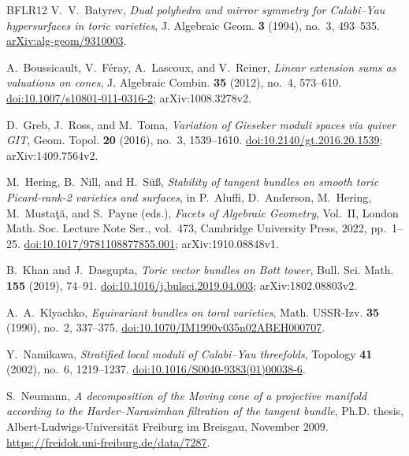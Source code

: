 \documentclass[11pt]{amsart}
\theoremstyle{definition}
\theoremstyle{remark}
\begin{document}
\begin{thebibliography}{BFLR12}
 V.~V.~Batyrev, \emph{Dual polyhedra and mirror symmetry for Calabi--Yau hypersurfaces in toric varieties}, J. Algebraic Geom. \textbf{3} (1994), no.~3, 493--535. \href{https://arxiv.org/abs/alg-geom/9310003}{arXiv:alg-geom/9310003}.

 A.~Boussicault, V.~F\'eray, A.~Lascoux, and V.~Reiner, \emph{Linear extension sums as valuations on cones}, J. Algebraic Combin. \textbf{35} (2012), no.~4, 573--610. \href{https://doi.org/10.1007/s10801-011-0316-2}{doi:10.1007/s10801-011-0316-2}; arXiv:1008.3278v2.

 D.~Greb, J.~Ross, and M.~Toma, \emph{Variation of Gieseker moduli spaces via quiver GIT}, Geom. Topol. \textbf{20} (2016), no.~3, 1539--1610. \href{https://doi.org/10.2140/gt.2016.20.1539}{doi:10.2140/gt.2016.20.1539}; arXiv:1409.7564v2.

 M.~Hering, B.~Nill, and H.~S\"u\ss, \emph{Stability of tangent bundles on smooth toric Picard-rank-2 varieties and surfaces}, in P.~Aluffi, D.~Anderson, M.~Hering, M.~Musta\c{t}\u{a}, and S.~Payne (eds.), \emph{Facets of Algebraic Geometry}, Vol.~II, London Math. Soc. Lecture Note Ser., vol.~473, Cambridge University Press, 2022, pp.~1--25. \href{https://doi.org/10.1017/9781108877855.001}{doi:10.1017/9781108877855.001}; arXiv:1910.08848v1.

 B.~Khan and J.~Dasgupta, \emph{Toric vector bundles on Bott tower}, Bull. Sci. Math. \textbf{155} (2019), 74--91. \href{https://doi.org/10.1016/j.bulsci.2019.04.003}{doi:10.1016/j.bulsci.2019.04.003}; arXiv:1802.08803v2.

 A.~A.~Klyachko, \emph{Equivariant bundles on toral varieties}, Math. USSR-Izv. \textbf{35} (1990), no.~2, 337--375. \href{https://doi.org/10.1070/IM1990v035n02ABEH000707}{doi:10.1070/IM1990v035n02ABEH000707}.

 Y.~Namikawa, \emph{Stratified local moduli of Calabi--Yau threefolds}, Topology \textbf{41} (2002), no.~6, 1219--1237. \href{https://doi.org/10.1016/S0040-9383(01)00038-6}{doi:10.1016/S0040-9383(01)00038-6}.

 S.~Neumann, \emph{A decomposition of the Moving cone of a projective manifold according to the Harder--Narasimhan filtration of the tangent bundle}, Ph.D. thesis, Albert-Ludwigs-Universit\"at Freiburg im Breisgau, November 2009. \url{https://freidok.uni-freiburg.de/data/7287}.


\end{thebibliography}
\end{document}
